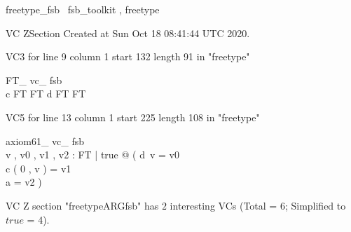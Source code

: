 \documentclass{article}
\begin{document}

\begin{zsection}	 \SECTION freetype\_fsb \parents~fsb\_toolkit , freetype
\end{zsection}

VC ZSection Created at Sun Oct 18 08:41:44 UTC 2020.

VC3 for line 9 column 1 start 132 length 91 in "freetype"
\begin{theorem}{ FT\_ vc\_ fsb}\\
 c \in \nat \cross FT \inj FT \land d \in FT \inj FT \\

\end{theorem}

VC5 for line 13 column 1 start 225 length 108 in "freetype"
\begin{theorem}{ axiom61\_ vc\_ fsb}\\
 \exists v , v0 , v1 , v2 : FT | true @ ( d~v = v0 \\
 c ( 0 , v ) = v1 \\
 a = v2 ) \\

\end{theorem}



 VC Z section "freetypeARGfsb" has $2$ interesting VCs (Total = 6; Simplified to $true$ = 4).



\end{document}
